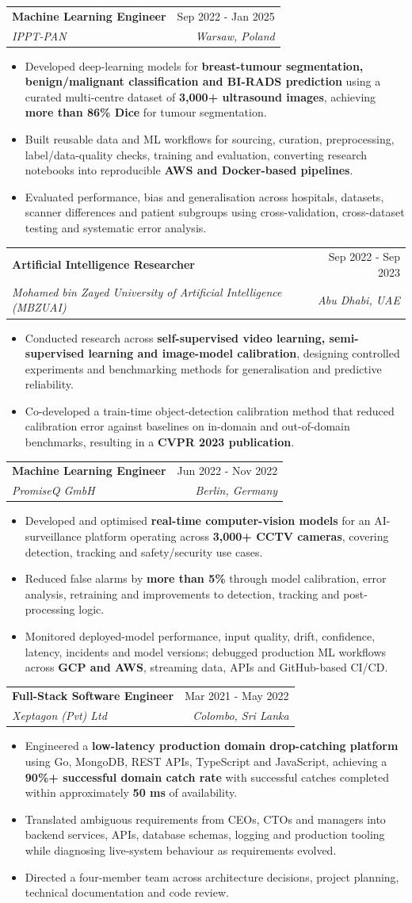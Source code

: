\documentclass[a4paper,10pt]{article}
\makeatletter
\newcommand{\resumeExperience}[4]{
  \vspace{-2pt}\item
    \begin{tabular*}{0.97\textwidth}[t]{l@{\extracolsep{\fill}}r}
      \textbf{#3} & #4 \\
      \textit{\small#1} & \textit{\small #2} \\
    \end{tabular*}\vspace{-7pt}
}
\newcommand{\resumeExperienceLong}[4]{
  \vspace{-2pt}\item
    \begin{tabularx}{0.97\textwidth}[t]{@{}Xr@{}}
      \textbf{#3} & #4 \\
      \textit{\small#1} & \textit{\small #2} \\
    \end{tabularx}\vspace{-7pt}
}
\newcommand{\resumeItem}[1]{\item \small #1}
\newcommand{\resumeItemListStart}{\begin{itemize}[itemsep=0.5pt,parsep=0pt,topsep=1.0pt,partopsep=0pt]}
\newcommand{\resumeItemListEnd}{\end{itemize}\vspace{-5.5pt}}
\makeatother
\begin{document}
\resumeExperienceLong{IPPT-PAN}{Warsaw, Poland}{Machine Learning Engineer \normalfont{\small(remote from Dec 2023)}}{Sep 2022 - Jan 2025}
\resumeItemListStart
\resumeItem{Developed deep-learning models for \textbf{breast-tumour segmentation, benign/malignant classification and BI-RADS prediction} using a curated multi-centre dataset of \textbf{3,000+ ultrasound images}, achieving \textbf{more than 86\% Dice} for tumour segmentation.}
\resumeItem{Built reusable data and ML workflows for sourcing, curation, preprocessing, label/data-quality checks, training and evaluation, converting research notebooks into reproducible \textbf{AWS and Docker-based pipelines}.}
\resumeItem{Evaluated performance, bias and generalisation across hospitals, datasets, scanner differences and patient subgroups using cross-validation, cross-dataset testing and systematic error analysis.}
\resumeItemListEnd

\resumeExperienceLong{Mohamed bin Zayed University of Artificial Intelligence (MBZUAI)}{Abu Dhabi, UAE}{Artificial Intelligence Researcher}{Sep 2022 - Sep 2023}
\resumeItemListStart
\resumeItem{Conducted research across \textbf{self-supervised video learning, semi-supervised learning and image-model calibration}, designing controlled experiments and benchmarking methods for generalisation and predictive reliability.}
\resumeItem{Co-developed a train-time object-detection calibration method that reduced calibration error against baselines on in-domain and out-of-domain benchmarks, resulting in a \textbf{CVPR 2023 publication}.}
\resumeItemListEnd

\resumeExperience{PromiseQ GmbH}{Berlin, Germany}{Machine Learning Engineer}{Jun 2022 - Nov 2022}
\resumeItemListStart
\resumeItem{Developed and optimised \textbf{real-time computer-vision models} for an AI-surveillance platform operating across \textbf{3,000+ CCTV cameras}, covering detection, tracking and safety/security use cases.}
\resumeItem{Reduced false alarms by \textbf{more than 5\%} through model calibration, error analysis, retraining and improvements to detection, tracking and post-processing logic.}
\resumeItem{Monitored deployed-model performance, input quality, drift, confidence, latency, incidents and model versions; debugged production ML workflows across \textbf{GCP and AWS}, streaming data, APIs and GitHub-based CI/CD.}
\resumeItemListEnd

\resumeExperience{Xeptagon (Pvt) Ltd}{Colombo, Sri Lanka}{Full-Stack Software Engineer}{Mar 2021 - May 2022}
\resumeItemListStart
\resumeItem{Engineered a \textbf{low-latency production domain drop-catching platform} using Go, MongoDB, REST APIs, TypeScript and JavaScript, achieving a \textbf{90\%+ successful domain catch rate} with successful catches completed within approximately \textbf{50 ms} of availability.}
\resumeItem{Translated ambiguous requirements from CEOs, CTOs and managers into backend services, APIs, database schemas, logging and production tooling while diagnosing live-system behaviour as requirements evolved.}
\resumeItem{Directed a four-member team across architecture decisions, project planning, technical documentation and code review.}
\resumeItemListEnd
\end{document}
